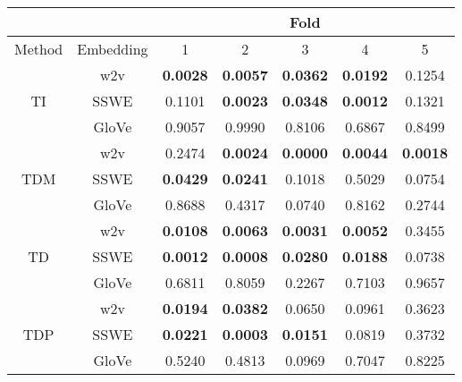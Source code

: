 \begin{tabular}{|c|c|c|c|c|c|c|}
\hline
  &       &  \multicolumn{5}{c|}{Fold} \\
\hline
 Method &   Embedding    &  1 &  2 &  3 &  4 &  5 \\
\hline 
\multirow{3}{*}{TI} & w2v &      \textbf{0.0028} &      \textbf{0.0057} &      \textbf{0.0362} &      \textbf{0.0192} &      0.1254 \\
& SSWE &      0.1101 &      \textbf{0.0023} &      \textbf{0.0348} &      \textbf{0.0012} &      0.1321 \\                 
& GloVe &      0.9057 &      0.9990 &      0.8106 &      0.6867 &      0.8499 \\
\hline
\multirow{3}{*}{TDM} & w2v &      0.2474 &      \textbf{0.0024} &      \textbf{0.0000} &      \textbf{0.0044} &      \textbf{0.0018} \\
& SSWE &      \textbf{0.0429} &      \textbf{0.0241} &      0.1018 &      0.5029 &      0.0754 \\  
& GloVe &      0.8688 &      0.4317 &      0.0740 &      0.8162 &      0.2744 \\
\hline
\multirow{3}{*}{TD} & w2v &      \textbf{0.0108} &      \textbf{0.0063} &      \textbf{0.0031} &      \textbf{0.0052} &      0.3455 \\
& SSWE &      \textbf{0.0012} &      \textbf{0.0008} &      \textbf{0.0280} &      \textbf{0.0188} &      0.0738 \\                    
& GloVe &      0.6811 &      0.8059 &      0.2267 &      0.7103 &      0.9657 \\
\hline
\multirow{3}{*}{TDP} & w2v &      \textbf{0.0194} &      \textbf{0.0382} &      0.0650 &      0.0961 &      0.3623 \\
& SSWE &      \textbf{0.0221} &      \textbf{0.0003} &      \textbf{0.0151} &      0.0819 &      0.3732 \\
& GloVe &      0.5240 &      0.4813 &      0.0969 &      0.7047 &      0.8225 \\
\hline
\end{tabular}